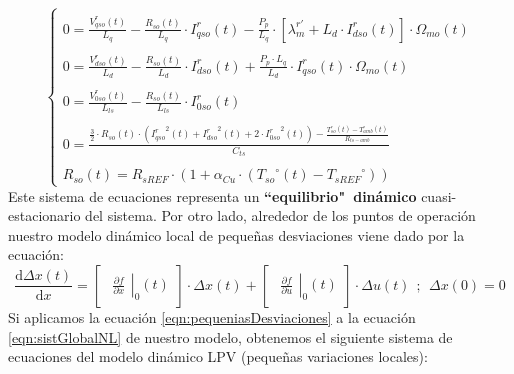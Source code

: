 \documentclass[10pt]{article}
\begin{document}
\begin{enumerate}
\begin{equation}
\begin{cases}
			\\
			0=\frac{V_{qso}^{r}(t)}{L_{q}}-\frac{R_{so}(t)}{L_{q}}\cdot I_{qso}^{r}(t)-\frac{P_{p}}{L_{q}}\cdot [ \lambda_{m}^{r'}+L_{d}\cdot I_{dso}^{r}(t) ]\cdot \Omega_{mo}(t)
			\\
			\\
			0=\frac{V_{dso}^{r}(t)}{L_{d}}-\frac{R_{so}\left ( t \right )}{L_{d}}\cdot I_{dso}^{r}(t)+\frac{P_{p}\cdot L_{q}}{L_{d}}\cdot I_{qso}^{r}(t)\cdot \Omega_{mo}(t)
			\\
			\\
			0=\frac{V_{0so}^{r}(t)}{L_{ls}}-\frac{R_{so}\left ( t \right )}{L_{ls}}\cdot I_{0so}^{r}(t)
			\\
			\\
			0=\frac{\frac{3}{2}\cdot R_{so}(t)\cdot \left ( {I_{qso}^{r}}^{2}(t)+{I_{dso}^{r}}^{2}(t)+2\cdot {I_{0so}^{r}}^{2}(t) \right )-\frac{T_{so}^{\circ}\left ( t \right )-T_{amb}^{\circ}\left ( t \right )}{R_{ts-amb}}}{C_{ts}}
			\\
			\\
			R_{so}(t)=R_{sREF}\cdot \left ( 1+\alpha_{Cu}\cdot \left ( {T_{so}}^{\circ}\left ( t \right )-{T_{sREF}}^{\circ} \right ) \right )
		\end{cases}
	\end{equation}
	Este sistema de ecuaciones representa un \textbf{``equilibrio"\  dinámico} cuasi-estacionario del sistema. Por otro lado, alrededor de los puntos de operación nuestro modelo dinámico local de pequeñas desviaciones viene dado por la ecuación:
	\begin{equation}
		\label{eqn:pequeniasDesviaciones}
		\frac{\mathrm{d} \Delta x(t)}{\mathrm{d} x}=
		\begin{bmatrix}
			\left.\begin{matrix}
				\frac{\partial f}{\partial x}
			\end{matrix}\right|_{0}(t)
		\end{bmatrix}\cdot\Delta x(t)+
		\begin{bmatrix}
			\left.\begin{matrix}
				\frac{\partial f}{\partial u}
			\end{matrix}\right|_{0}(t)
		\end{bmatrix}\cdot\Delta u(t)
		\ \ ;\ \ \Delta x(0)=0
	\end{equation}
	Si aplicamos la ecuación \ref{eqn:pequeniasDesviaciones} a la ecuación \ref{eqn:sistGlobalNL} de nuestro modelo, obtenemos el siguiente sistema de ecuaciones del modelo dinámico LPV (pequeñas variaciones locales):
	\newline

\end{enumerate}
\end{document}
